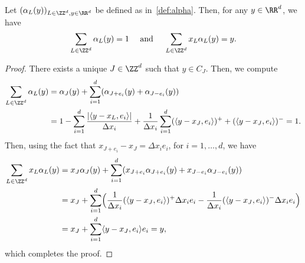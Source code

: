 \begin{lemm}\label{propalpha}
Let $(\alpha_{L}(y))_{L \in \ZZ^d,y \in \RR^d}$ be defined as in~\eqref{def:alpha}. Then, for any $y \in \RR^d$, we have
\[
\sum_{L\in \ZZ^d} \alpha_{L}(y) = 1 \quad \text{ and } \quad \sum_{L\in \ZZ^d} x_L \alpha_{L}(y) = y.
\]
\end{lemm}

\begin{proof}
There exists a unique $J\in \ZZ^d$ such that $y\in C_J$. Then, we compute
\begin{align*}
\sum_{L\in \ZZ^d} \alpha_{L}(y) & = \alpha_{J}(y) + \sum_{i=1}^d (\alpha_{J+e_i}(y)+\alpha_{J-e_i}(y))
\\
& = 1 - \sum_{i=1}^d \frac{|\langle y-{x_L},e_i\rangle|}{\Delta x_i} + \frac{1}{\Delta x_i} \sum_{i=1}^d (\langle y-x_{J},e_i\rangle )^+ + (\langle y-x_{J},e_i\rangle )^- = 1.
\end{align*}
Then, using the fact that $x_{J+e_i}-x_J = \Delta x_i e_i$, for $i=1,\ldots,d$, we have
\begin{align*}
\sum_{L\in \ZZ^d} x_L \alpha_{L}(y) & = x_J \alpha_J(y) + \sum_{i=1}^d (x_{J+e_i} \alpha_{J+e_i}(y)+ x_{J-e_i} \alpha_{J-e_i}(y))
\\
& = x_J + \sum_{i=1}^d \Bigl(\frac{1}{\Delta x_i} (\langle y-x_J, e_i\rangle )^+ \Delta x_i e_i - \frac{1}{\Delta x_i} (\langle y-x_J, e_i \rangle)^- \Delta x_i e_i \Bigr) \\
& = x_J + \sum_{i=1}^d \langle y-x_J, e_i\rangle e_i = y,
\end{align*}
which completes the proof.
\end{proof}

